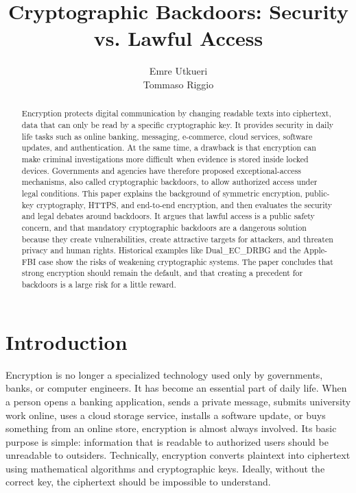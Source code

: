 \documentclass{easychair}
\title{Cryptographic Backdoors: Security vs. Lawful Access}
\author{Emre Utkueri \\Tommaso Riggio}
\institute{Cybersecurity and National Defense}\\
\begin{document}
\maketitle

\setcounter{tocdepth}{2}
{\small
\tableofcontents}

\begin{abstract}
Encryption protects digital communication by changing readable texts into ciphertext, data that can only be read by a specific cryptographic key. It provides security in daily life tasks such as online banking, messaging, e-commerce, cloud services, software updates, and authentication. At the same time, a drawback is that encryption can make criminal investigations more difficult when evidence is stored inside locked devices. Governments and agencies have therefore proposed exceptional-access mechanisms, also called cryptographic backdoors, to allow authorized access under legal conditions. This paper explains the background of symmetric encryption, public-key cryptography, HTTPS, and end-to-end encryption, and then evaluates the security and legal debates around backdoors. It argues that lawful access is a public safety concern, and that mandatory cryptographic backdoors are a dangerous solution because they create vulnerabilities, create attractive targets for attackers, and threaten privacy and human rights. Historical examples like Dual\_EC\_DRBG and the Apple-FBI case show the risks of weakening cryptographic systems. The paper concludes that strong encryption should remain the default, and that creating a precedent for backdoors is a large risk for a little reward.
\end{abstract}

\section{Introduction}

Encryption is no longer a specialized technology used only by governments, banks, or computer engineers. It has become an essential part of daily life. When a person opens a banking application, sends a private message, submits university work online, uses a cloud storage service, installs a software update, or buys something from an online store, encryption is almost always involved. Its basic purpose is simple: information that is readable to authorized users should be unreadable to outsiders. Technically, encryption converts plaintext into ciphertext using mathematical algorithms and cryptographic keys. Ideally, without the correct key, the ciphertext should be impossible to understand.
\end{document}
